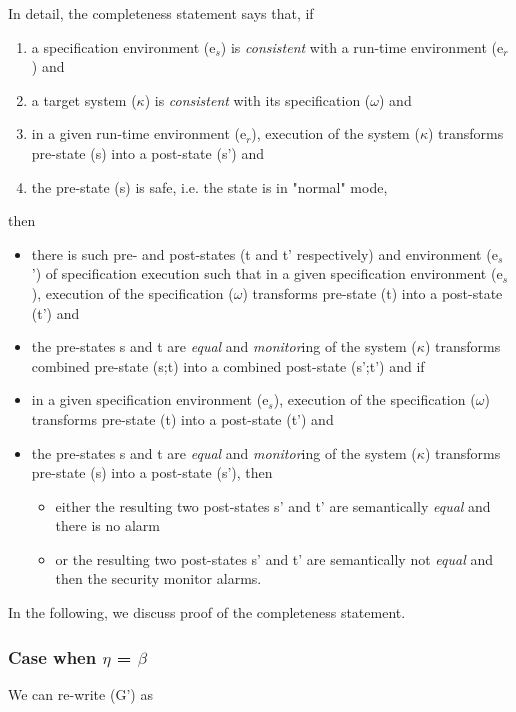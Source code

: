 \documentclass[conference]{IEEEtran}
\begin{document}
In detail, the completeness statement says that, if
\begin{enumerate}
\item a specification environment (e$_s$) is \emph{consistent} with a run-time environment (e$_r$) and
\item a target system ($\kappa$) is \emph{consistent} with its specification ($\omega$) and
\item in a given run-time environment (e$_r$), execution of the system ($\kappa$) transforms pre-state (s) into a post-state (s') and
\item the pre-state (s) is safe, i.e. the state is in "normal" mode,
\end{enumerate}
then 
\begin{itemize}
\item there is such pre- and post-states (t and t' respectively) and environment (e$_s$') of specification execution such that in a given specification environment (e$_s$), execution of the specification ($\omega$) transforms pre-state (t) into a post-state (t') and
\item the pre-states s and t are \emph{equal} and \emph{monitor}ing of the system ($\kappa$) transforms combined pre-state (s;t) into a combined post-state (s';t') and if
\item in a given specification environment (e$_s$), execution of the specification ($\omega$) transforms pre-state (t) into a post-state (t') and
\item the pre-states s and t are \emph{equal} and \emph{monitor}ing of the system ($\kappa$) transforms pre-state (s) into a post-state (s'), then
\begin{itemize}
\item either the resulting two post-states s' and t' are semantically \emph{equal} and there is no alarm
\item or the resulting two post-states s' and t' are semantically not \emph{equal} and then the security monitor alarms.
\end{itemize}
\end{itemize}

In the following, we discuss proof of the completeness statement.

\subsubsection{Case when $\eta$ = $\beta$}

We can re-write (G') as
\end{document}
